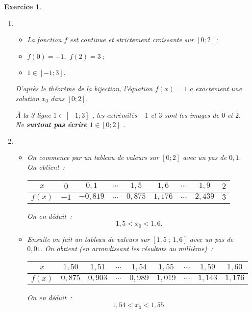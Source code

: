 \documentclass[10pt]{article}
\newtheorem{exo}{Exercice}
\begin{document}
\begin{exo}
\begin{enumerate}
\begin{multicols}{2}
\end{multicols}
  \item \begin{itemize}
\item[\textbullet] La fonction $f$ est continue et strictement croissante sur $\left[0;2\right]~;$
\item[\textbullet] $f(0)=-1,$ $f(2)=3~;$
\item[\textbullet] $1\in\left[-1;3\right].$
\end{itemize}

D'après le théorème de la bijection, l'équation $f(x)=1$ a exactement une solution  $x_0$ dans $\left[0;2\right].$


\medskip

\Large \danger \normalsize \`A la 3 ligne \og $1\in\left[-1;3\right]$ \fg , les extrémités $-1$ et $3$ sont les images de $0$ et $2.$ Ne \textbf{surtout pas écrire} \og $1\in\left[0;2\right]$ \fg.
  \item  \begin{itemize}
\item[\textbullet] On commence par un tableau de valeurs sur $\left[0;2\right]$ avec un pas de $0,1.$ On obtient~:

\medskip
\begin{center}
\begin{tabular}{|c|c|c|c|c|c|c|c|c|}
\hline
$x$&$0$&$0,1$&$\dots$&$1,5$&$1,6$&$\dots$&$1,9$&$2$\\ \hline
$f(x)$&$-1$&$-0,819$&$\dots$&$0,875$&$1,176$&$\dots$&$2,439$&$3$\\ \hline
\end{tabular}
\end{center}

\medskip


On en déduit~:\[1,5<x_0<1,6.\]
\item[\textbullet] Ensuite on fait un tableau de valeurs sur $\left[1,5~;~1,6\right]$ avec un pas de $0,01.$ On obtient (en arrondissant les résultats au millième)~:

\medskip

\begin{center}

\begin{tabular}{|c|c|c|c|c|c|c|c|c|}
\hline
$x$&$1,50$&$1,51$&$\dots$&$1,54$&$1,55$&$\dots$&$1,59$&$1,60$\\ \hline
$f(x)$&$0,875$&$ 0,903$&$\dots$&$0,989$&$1,019$&$\dots$&$1,143$&$1,176$\\ \hline
\end{tabular}
\end{center}

\medskip



On en déduit~:\[1,54<x_0<1,55.\]
\end{itemize}
 \end{enumerate}
 
 

\end{exo}
\end{document}

